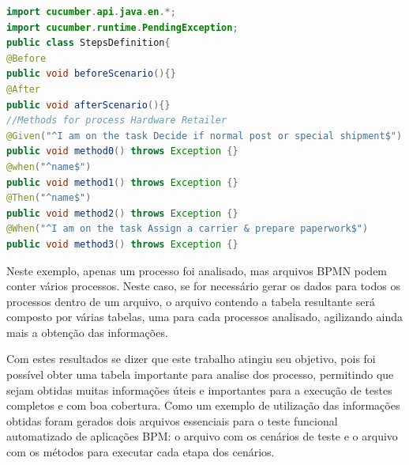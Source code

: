 \documentclass[12pt]{article}
\begin{document}
\begin{lstlisting}[language=Java]
import cucumber.api.java.en.*;
import cucumber.runtime.PendingException;
public class StepsDefinition{
@Before
public void beforeScenario(){}
@After
public void afterScenario(){} 
//Methods for process Hardware Retailer
@Given("^I am on the task Decide if normal post or special shipment$") 
public void method0() throws Exception {} 
@when("^name$") 
public void method1() throws Exception {} 
@Then("^name$") 
public void method2() throws Exception {} 
@When("^I am on the task Assign a carrier & prepare paperwork$") 
public void method3() throws Exception {} 
\end{lstlisting}




Neste exemplo, apenas um processo foi analisado, mas arquivos BPMN podem conter vários processos. Neste caso, se for necessário gerar os dados para todos os processos dentro de um arquivo, o arquivo contendo a tabela resultante será composto por várias tabelas, uma para cada processos analisado, agilizando ainda mais a obtenção das informações. 








Com estes resultados se dizer que este trabalho atingiu seu objetivo, pois foi possível obter uma tabela importante para analise dos processo, permitindo que sejam obtidas muitas informações úteis e importantes para a execução de testes completos e com boa cobertura. Como um exemplo de utilização das informações obtidas foram gerados dois arquivos essenciais para o teste funcional automatizado de aplicações BPM: o arquivo com os cenários de teste e o arquivo com os métodos para executar cada etapa dos cenários.
\end{document}
